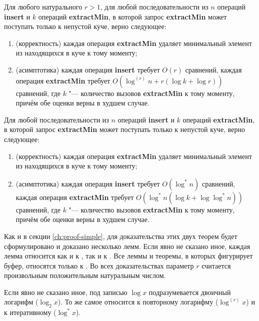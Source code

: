 \begin{theorem} \label{th:fast-correct-r}
Для любого натурального $r > 1$, для любой последовательности из
$n$ операций \textbf{insert} и $k$ операций \textbf{extractMin},
в которой запрос \textbf{extractMin} может поступать только к непустой
куче, верно следующее:
\begin{enumerate}
\item (корректность) каждая операция \textbf{extractMin} удаляет минимальный элемент
из находящихся в куче к тому моменту;
\item (асимптотика) каждая операция \textbf{insert} требует $O(r)$ сравнений,
каждая операция \textbf{extractMin} требует $O(\log^{(r)} n + r(\log k + \log r))$ сравнений,
где $k$ "--- количество вызовов \textbf{extractMin} к тому моменту, причём
обе оценки верны в худшем случае.
\end{enumerate}
\end{theorem}

\begin{theorem} \label{th:fast-correct-*}
Для любой последовательности из
$n$ операций \textbf{insert} и $k$ операций \textbf{extractMin},
в которой запрос \textbf{extractMin} может поступать только к непустой
куче, верно следующее:
\begin{enumerate}
\item (корректность) каждая операция \textbf{extractMin} удаляет минимальный элемент
из находящихся в куче к тому моменту;
\item (асимптотика) каждая операция \textbf{insert} требует $O(\log^* n)$ сравнений,
каждая операция \textbf{extractMin} требует $O(\log^* n(\log k + \log \log^* n))$ сравнений,
где $k$ "--- количество вызовов \textbf{extractMin} к тому моменту, причём
обе оценки верны в худшем случае.
\end{enumerate}
\end{theorem}

\bigskip

Как и в секции \ref{ch:proof-simple}, для доказательства этих двух теорем
будет сформулировано и доказано несколько лемм. Если явно не сказано иное,
каждая лемма относится как и к \CH[r], так и к \CH[*]. Все леммы и теоремы,
в которых фигурирует буфер, относятся только к \CH[r]. Во всех доказательствах
параметр $r$ считается произвольным положительным натуральным числом.

\begin{remark}
Если явно не сказано иное, под записью $\log x$ подразумевается
двоичный логарифм ($\log_2 x$). То же самое относится к повторному
логарифму ($\log^{(r)} x$) и к итеративному ($\log^* x$).
\end{remark}

